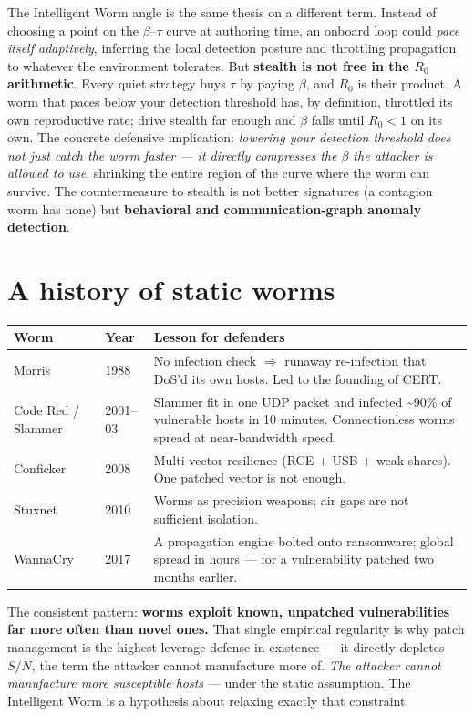 \documentclass[11pt,a4paper]{article}
\begin{document}
The Intelligent Worm angle is the same thesis on a different term. Instead of choosing a point on the $\beta$--$\tau$ curve at authoring time, an onboard loop could \emph{pace itself adaptively}, inferring the local detection posture and throttling propagation to whatever the environment tolerates. But \textbf{stealth is not free in the $R_0$ arithmetic}. Every quiet strategy buys $\tau$ by paying $\beta$, and $R_0$ is their product. A worm that paces below your detection threshold has, by definition, throttled its own reproductive rate; drive stealth far enough and $\beta$ falls until $R_0 < 1$ on its own. The concrete defensive implication: \emph{lowering your detection threshold does not just catch the worm faster --- it directly compresses the $\beta$ the attacker is allowed to use}, shrinking the entire region of the curve where the worm can survive. The countermeasure to stealth is not better signatures (a contagion worm has none) but \textbf{behavioral and communication-graph anomaly detection}.

\section{A history of static worms}

\begin{center}
\small
\begin{tabularx}{\linewidth}{@{}l l X@{}}
\toprule
\textbf{Worm} & \textbf{Year} & \textbf{Lesson for defenders} \\
\midrule
Morris & 1988 & No infection check $\Rightarrow$ runaway re-infection that DoS'd its own hosts. Led to the founding of CERT. \\
Code Red / Slammer & 2001--03 & Slammer fit in one UDP packet and infected \textasciitilde90\% of vulnerable hosts in 10 minutes. Connectionless worms spread at near-bandwidth speed. \\
Conficker & 2008 & Multi-vector resilience (RCE + USB + weak shares). One patched vector is not enough. \\
Stuxnet & 2010 & Worms as precision weapons; air gaps are not sufficient isolation. \\
WannaCry & 2017 & A propagation engine bolted onto ransomware; global spread in hours --- for a vulnerability patched two months earlier. \\
\bottomrule
\end{tabularx}
\end{center}

The consistent pattern: \textbf{worms exploit known, unpatched vulnerabilities far more often than novel ones.} That single empirical regularity is why patch management is the highest-leverage defense in existence --- it directly depletes $S/N$, the term the attacker cannot manufacture more of. \emph{The attacker cannot manufacture more susceptible hosts} --- under the static assumption. The Intelligent Worm is a hypothesis about relaxing exactly that constraint.
\end{document}
